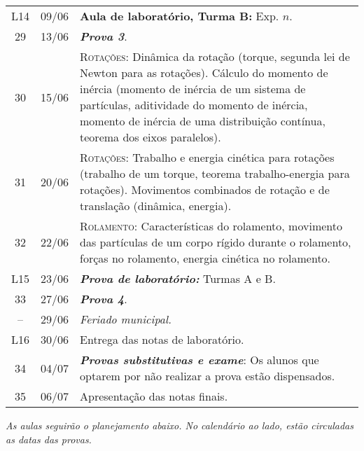 \begin{center}
\begin{longtable}{ccp{70mm}}
L14  &  09/06    &  \textbf{Aula de laboratório, Turma B:} Exp. $n$.\\
29	 & 	13/06	 & 	\textbf{\textit{Prova 3}}. \\
30	 & 	15/06	 & 	\textsc{Rotações:} Dinâmica da rotação (torque, segunda lei de Newton para as rotações). Cálculo do momento de inércia (momento de inércia de um sistema de partículas, aditividade do momento de inércia, momento de inércia de uma distribuição contínua, teorema dos eixos paralelos). \\
31	 & 	20/06	 & 	\textsc{Rotações:} Trabalho e energia cinética para rotações (trabalho de um torque, teorema trabalho-energia para rotações). Movimentos combinados de rotação e de translação (dinâmica, energia).\\
32	 & 	22/06	 & 	\textsc{Rolamento:} Características do rolamento, movimento das partículas de um corpo rígido durante o rolamento, forças no rolamento, energia cinética no rolamento. \\
L15  &  23/06    &  \textbf{\textit{Prova de laboratório:}} Turmas A e B. \\
33	 & 	27/06	 & 	\textbf{\textit{Prova 4}}. \\
--	 & 	29/06	 & 	\emph{Feriado municipal.} \\
L16  &  30/06    &  Entrega das notas de laboratório. \\
34	 & 	04/07	 & 	\textbf{\textit{Provas substitutivas e exame}}: Os alunos que optarem por não realizar a prova estão dispensados. \\
35	 & 	06/07	 & 	Apresentação das notas finais. \\
\end{longtable}
\end{center}


\clearpage
\begin{fullwidth}
\it
As aulas seguirão o planejamento abaixo. No calendário ao lado, estão circuladas as datas das provas.
\end{fullwidth}


